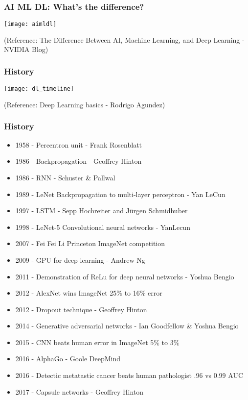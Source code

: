 \begin{frame}[fragile] \frametitle{AI ML DL: What's the difference?}
\begin{center}
\texttt{[image: aimldl]}
\end{center}

\tiny{(Reference: The Difference Between AI, Machine Learning, and Deep Learning - NVIDIA Blog)}
\end{frame}


\begin{frame}[fragile] \frametitle{History}
\begin{center}
\texttt{[image: dl\_timeline]}
\end{center}

\tiny{(Reference: Deep Learning basics - Rodrigo Agundez)}
\end{frame}

\begin{frame}[fragile] \frametitle{History}
\begin{itemize}
\item  1958 - Percentron unit - Frank Rosenblatt
\item  1986 - Backpropagation - Geoffrey Hinton
\item 1986 - RNN - Schuster \& Pallwal
\item  1989 - LeNet Backpropagation to multi-layer perceptron - Yan LeCun
\item 1997 - LSTM - Sepp Hochreiter and Jürgen Schmidhuber
\item  1998 - LeNet-5 Convolutional neural networks - YanLecun
\item  2007 - Fei Fei Li Princeton ImageNet competition
\item  2009 - GPU for deep learning - Andrew Ng
\item  2011 - Demonstration of ReLu for deep neural networks - Yoshua Bengio
\item  2012 - AlexNet wins ImageNet 25\% to 16\% error
\item  2012 - Dropout technique - Geoffrey Hinton
\item  2014 - Generative adversarial networks - Ian Goodfellow \& Yoshua Bengio
\item  2015 - CNN beats human error in ImageNet 5\% to 3\%
\item  2016 - AlphaGo - Goole DeepMind
\item  2016 - Detectic metatastic cancer beats human pathologist .96 vs 0.99 AUC
\item  2017 - Capsule networks - Geoffrey Hinton
\end{itemize}
\end{frame}

